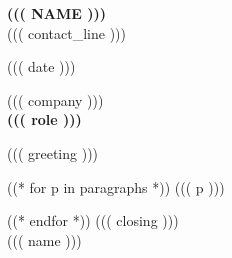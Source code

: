 \documentclass[11pt,letterpaper]{article}
\begin{document}
\begin{center}
  {\Large\bfseries\lsstyle\MakeUppercase{((( name )))}}\\[3pt]
  {\small ((( contact_line )))}
\end{center}
\vspace{0.6em}

((( date )))

((( company )))\\
\textbf{((( role )))}

((( greeting )))

((* for p in paragraphs *))
((( p )))

((* endfor *))
((( closing )))\\[0.4em]
((( name )))
\end{document}
